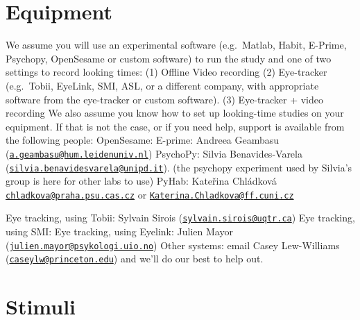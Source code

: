 \documentclass[
]{book}
\begin{document}
\hypertarget{equipment}{%
\section{Equipment}\label{equipment}}

We assume you will use an experimental software (e.g.~Matlab, Habit, E-Prime, Psychopy, OpenSesame or custom software) to run the study and one of two settings to record looking times:
(1) Offline Video recording
(2) Eye-tracker (e.g.~Tobii, EyeLink, SMI, ASL, or a different company, with appropriate software from the eye-tracker or custom software).
(3) Eye-tracker + video recording
We also assume you know how to set up looking-time studies on your equipment. If that is not the case, or if you need help, support is available from the following people:
OpenSesame:
E-prime: Andreea Geambasu (\href{mailto:a.geambasu@hum.leidenuniv.nl}{\nolinkurl{a.geambasu@hum.leidenuniv.nl}})
PsychoPy: Silvia Benavides-Varela (\href{mailto:silvia.benavidesvarela@unipd.it}{\nolinkurl{silvia.benavidesvarela@unipd.it}}). (the psychopy experiment used by Silvia's group is here for other labs to use)
PyHab: Kateřina Chládková \href{mailto:chladkova@praha.psu.cas.cz}{\nolinkurl{chladkova@praha.psu.cas.cz}} or \href{mailto:Katerina.Chladkova@ff.cuni.cz}{\nolinkurl{Katerina.Chladkova@ff.cuni.cz}}

Eye tracking, using Tobii: Sylvain Sirois (\href{mailto:sylvain.sirois@uqtr.ca}{\nolinkurl{sylvain.sirois@uqtr.ca}})
Eye tracking, using SMI:
Eye tracking, using Eyelink: Julien Mayor (\href{mailto:julien.mayor@psykologi.uio.no}{\nolinkurl{julien.mayor@psykologi.uio.no}})
Other systems: email Casey Lew-Williams (\href{mailto:caseylw@princeton.edu}{\nolinkurl{caseylw@princeton.edu}}) and we'll do our best to help out.

\hypertarget{stimuli}{%
\section{Stimuli}\label{stimuli}}
\end{document}
